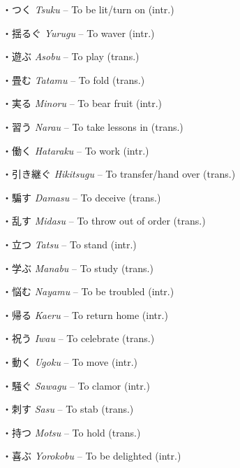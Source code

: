 \par{・つく \emph{Tsuku }– To be lit\slash turn on (intr.) }

\par{・揺るぐ \emph{Yurugu }– To waver (intr.) }

\par{・遊ぶ \emph{Asobu }– To play (trans.) }

\par{・畳む \emph{Tatamu }– To fold (trans.) }

\par{・実る \emph{Minoru }– To bear fruit (intr.) }

\par{・習う \emph{Narau }– To take lessons in (trans.) }

\par{・働く \emph{Hataraku }– To work (intr.) }

\par{・引き継ぐ \emph{Hikitsugu }– To transfer\slash hand over (trans.) }

\par{・騙す \emph{Damasu }– To deceive (trans.) }

\par{・乱す \emph{Midasu }– To throw out of order (trans.) }

\par{・立つ \emph{Tatsu }– To stand (intr.) }

\par{・学ぶ \emph{Manabu }– To study (trans.) }

\par{・悩む \emph{Nayamu }– To be troubled (intr.) }

\par{・帰る \emph{Kaeru }– To return home (intr.) }

\par{・祝う \emph{Iwau }– To celebrate (trans.) }

\par{・動く \emph{Ugoku }– To move (intr.) }

\par{・騒ぐ \emph{Sawagu }– To clamor (intr.) }

\par{・刺す \emph{Sasu }– To stab (trans.) }

\par{・持つ \emph{Motsu }– To hold (trans.) }

\par{・喜ぶ \emph{Yorokobu }– To be delighted (intr.) }

